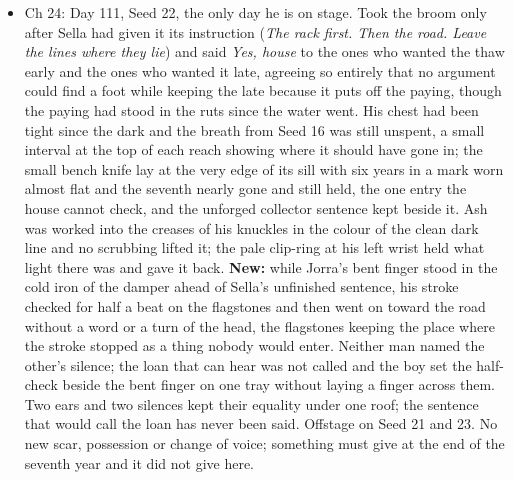 \documentclass{design/chronicle}
\begin{document}
{\begin{itemize}[leftmargin=1.4em,itemsep=1pt,topsep=3pt,parsep=0pt]
\item Ch 24: Day 111, Seed 22, the only day he is on stage. Took the broom only after Sella had given it its instruction (\emph{The rack first. Then the road. Leave the lines where they lie}) and said \emph{Yes, house} to the ones who wanted the thaw early and the ones who wanted it late, agreeing so entirely that no argument could find a foot while keeping the late because it puts off the paying, though the paying had stood in the ruts since the water went. His chest had been tight since the dark and the breath from Seed 16 was still unspent, a small interval at the top of each reach showing where it should have gone in; the small bench knife lay at the very edge of its sill with six years in a mark worn almost flat and the seventh nearly gone and still held, the one entry the house cannot check, and the unforged collector sentence kept beside it. Ash was worked into the creases of his knuckles in the colour of the clean dark line and no scrubbing lifted it; the pale clip-ring at his left wrist held what light there was and gave it back. \textbf{New:} while Jorra’s bent finger stood in the cold iron of the damper ahead of Sella’s unfinished sentence, his stroke checked for half a beat on the flagstones and then went on toward the road without a word or a turn of the head, the flagstones keeping the place where the stroke stopped as a thing nobody would enter. Neither man named the other’s silence; the loan that can hear was not called and the boy set the half-check beside the bent finger on one tray without laying a finger across them. Two ears and two silences kept their equality under one roof; the sentence that would call the loan has never been said. Offstage on Seed 21 and 23. No new scar, possession or change of voice; something must give at the end of the seventh year and it did not give here.

\end{itemize}

\begin{itemize}[leftmargin=1.4em,itemsep=1pt,topsep=3pt,parsep=0pt]


\end{itemize}}
\end{document}
